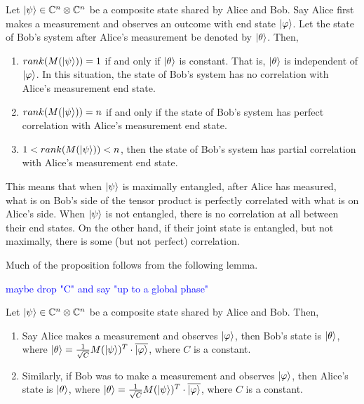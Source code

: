 \begin{prop}
\label{entanglement-rank}
Let $\ket{\psi} \in \mathbb{C}^n \otimes \mathbb{C}^{n}$ be a composite state shared by Alice and Bob. Say Alice first makes a measurement and observes an outcome with end state $\ket{\varphi}$. Let the state of Bob's system after Alice's measurement be denoted by $\ket{\theta}$. Then,
\begin{enumerate}
    \item $rank(M(\ket{\psi}))=1$ if and only if $\ket{\theta}$ is constant.  That is, $\ket{\theta}$ is independent of $\ket{\varphi}$. In this situation, the state of Bob's system has no correlation with Alice's measurement end state.
    \item $rank(M(\ket{\psi}))=n$ if and only if the state of Bob's system has perfect correlation with Alice's measurement end state.
    \item $1<rank(M(\ket{\psi}))<n$, then the state of Bob's system has partial correlation with Alice's measurement end state.
\end{enumerate}
\end{prop}

This means that when $\ket{\psi}$ is maximally entangled, after Alice has measured, what is on Bob's side of the tensor product is perfectly correlated with what is on Alice's side.  When $\ket{\psi}$ is not entangled, there is no correlation at all between their end states.  On the other hand, if their joint state is entangled, but not maximally, there is some (but not perfect) correlation.  

Much of the proposition follows from the following lemma.  



\textcolor{blue}{maybe drop "C" and say "up to a global phase"}
\begin{lemma}
\label{end state lemma}
Let $\ket{\psi} \in \mathbb{C}^n \otimes \mathbb{C}^{n}$ be a composite state shared by Alice and Bob.  Then,
\begin{enumerate}
\item Say Alice makes a measurement and observes $\ket{\varphi}$, then Bob's state is $\ket{\theta}$, where $\ket{\theta}=\frac{1}{\sqrt{C}}M(\ket{\psi})^T \cdot \overline{\ket{\varphi}}$, where $C$ is a constant.
\item Similarly, if Bob was to make a measurement and observes $\ket{\varphi}$, then Alice's state is $\ket{\theta}$, where $\ket{\theta}=\frac{1}{\sqrt{C}}M(\ket{\psi})^T\cdot \overline{\ket{\varphi}}$, where $C$ is a constant.\\

\end{enumerate}
\end{lemma}

